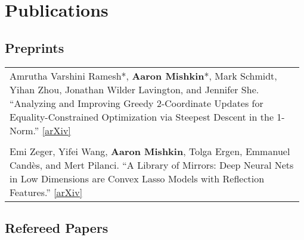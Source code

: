 \documentclass[10pt]{article}
\newcommand{\spacing}{\vspace{0.5cm}}
\begin{document}
\spacing

\section{Publications}

\vspace{1em}

\subsection*{Preprints}

\begin{tabular}{L{0.98\linewidth}}
    Amrutha Varshini Ramesh*, \textbf{Aaron Mishkin}*, Mark Schmidt, Yihan Zhou,
    Jonathan Wilder Lavington, and Jennifer She.
    ``Analyzing and Improving Greedy 2-Coordinate Updates for Equality-Constrained Optimization via Steepest Descent in the 1-Norm.'' \href{https://arxiv.org/abs/2307.01169}{[arXiv]}
    \\  \\
    Emi Zeger, Yifei Wang, \textbf{Aaron Mishkin}, Tolga Ergen, Emmanuel Candès,
    and Mert Pilanci. ``A Library of Mirrors: Deep Neural Nets in Low Dimensions are
    Convex Lasso Models with Reflection Features.'' \href{https://arxiv.org/abs/2403.01046}{[arXiv]}                                                                 \\
\end{tabular}

\subsection*{Refereed Papers}
\end{document}
